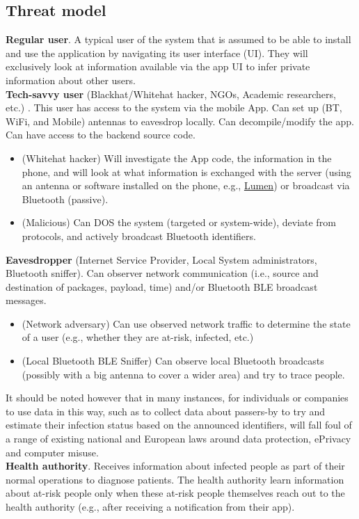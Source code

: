 \documentclass[12pt,a4paper]{article}
\begin{document}
\subsection*{Threat model}
\textbf{Regular user}. A typical user of the system that is assumed to be able to install and use the application by navigating its user interface (UI). They will exclusively look at information available via the app UI to infer private information about other users.\\[0.3cm]
\textbf{Tech-savvy user} (Blackhat/Whitehat hacker, NGOs, Academic researchers, etc.) .
This user has access to the system via the mobile App. Can set up (BT, WiFi, and Mobile)
antennas to eavesdrop locally. Can decompile/modify the app. Can have access to the
backend source code.
\begin{itemize}\itemsep0pt
\item (Whitehat hacker) Will investigate the App code, the information in the phone, and will look at what information is exchanged with the server (using an antenna or software
installed on the phone, e.g., \href{http://www.haystack.mobi}{\underline{Lumen}}) or broadcast via Bluetooth (passive).
\item (Malicious) Can DOS the system (targeted or system-wide), deviate from protocols, and actively broadcast Bluetooth identifiers.
\end{itemize}
\textbf{Eavesdropper} (Internet Service Provider, Local System administrators, Bluetooth sniffer). Can observer network communication (i.e., source and destination of packages, payload, time) and/or Bluetooth BLE broadcast messages.
\begin{itemize}
\item  (Network adversary) Can use observed network traffic to determine the state of a
user (e.g., whether they are at-risk, infected, etc.)
\item (Local Bluetooth BLE Sniffer) Can observe local Bluetooth broadcasts (possibly with
a big antenna to cover a wider area) and try to trace people.
\end{itemize}
It should be noted however that in many instances, for individuals or companies to use data in this way, such as to collect data about passers-by to try and estimate their infection status based on the announced identifiers, will fall foul of a range of existing national and European laws around data protection, ePrivacy and computer misuse.\\[0.3cm]
\textbf{Health authority}. Receives information about infected people as part of their normal operations to diagnose patients. The health authority learn information about at-risk people only when these at-risk people themselves reach out to the health authority (e.g., after receiving a notification from their app).\\[0.3cm]
\end{document}
